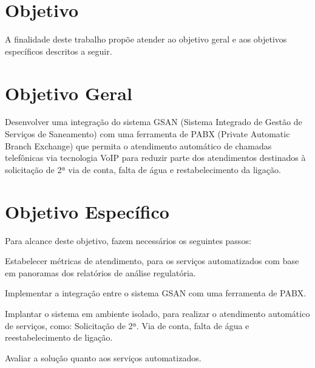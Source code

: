 \section{Objetivo}

A finalidade deste trabalho propõe atender ao objetivo geral e aos objetivos específicos descritos a seguir.

\section{Objetivo Geral}

Desenvolver uma integração do sistema GSAN (Sistema Integrado de Gestão de Serviços de Saneamento) com uma ferramenta de PABX (Private Automatic Branch Exchange) que permita o atendimento automático de chamadas telefônicas via tecnologia VoIP para reduzir parte dos atendimentos destinados à solicitação de 2ª via de conta, falta de água e restabelecimento da ligação.

\section{Objetivo Específico}
Para alcance deste objetivo, fazem necessários os seguintes passos:
\begin{description}
	\item Estabelecer métricas de atendimento, para os serviços automatizados com base em panoramas dos relatórios de análise regulatória. 
	\item Implementar a integração entre o sistema GSAN com uma ferramenta de PABX.
	\item Implantar o sistema em ambiente isolado, para realizar o atendimento automático de serviços, como: Solicitação de 2ª. Via de conta, falta de água e reestabelecimento de ligação.
	\item Avaliar a solução quanto aos serviços automatizados.
\end{description}
